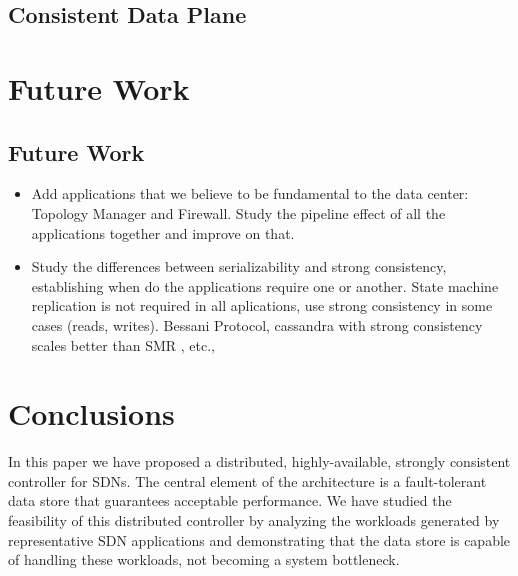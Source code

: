 \subsection{Consistent Data Plane}

\section{Future Work}


\subsection{Future Work}
\begin{itemize}
\item Add applications that we believe to be fundamental to the data center: Topology Manager and Firewall.  Study the pipeline effect of all the applications together and improve on that. 
\item Study the differences between serializability and strong consistency, establishing when do the applications require one or another. State machine replication is not required in all aplications, use strong consistency in some cases (reads, writes). Bessani Protocol, cassandra with strong consistency scales better than SMR , etc., 
\end{itemize}


\section{Conclusions}

In this paper we have proposed a distributed, highly-available, strongly consistent controller for SDNs.
The central element of the architecture is a fault-tolerant data store that guarantees acceptable performance.
We have studied the feasibility of this distributed controller by analyzing  the workloads generated by representative SDN applications and demonstrating that the data store is capable of handling these workloads, not becoming a system bottleneck.

